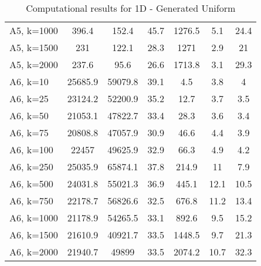 \documentclass{article}
\begin{document}
\begin{center}
\begin{table}[h]
\begin{tabular}{|l||c|c|c|c|c|c|}
    A5, k=1000 & 396.4 & 152.4 & 45.7 & 1276.5 & 5.1 & 24.4\\
    A5, k=1500 & 231 & 122.1 & 28.3 & 1271 & 2.9 & 21\\
A5, k=2000 & 237.6 & 95.6 & 26.6 & 1713.8 & 3.1 & 29.3\\
    \hline
    A6, k=10 & 25685.9 & 59079.8 & 39.1 & 4.5 & 3.8 & 4\\
    A6, k=25 & 23124.2 & 52200.9 & 35.2 & 12.7 & 3.7 & 3.5\\
    A6, k=50 & 21053.1 & 47822.7 & 33.4 & 28.3 & 3.6 & 3.4\\
    A6, k=75 & 20808.8 & 47057.9 & 30.9 & 46.6 & 4.4 & 3.9\\
    A6, k=100 & 22457 & 49625.9 & 32.9 & 66.3 & 4.9 & 4.2\\
    A6, k=250 & 25035.9 & 65874.1 & 37.8 & 214.9 & 11 & 7.9\\
    A6, k=500 & 24031.8 & 55021.3 & 36.9 & 445.1 & 12.1 & 10.5\\
    A6, k=750 & 22178.7 & 56826.6 & 32.5 & 676.8 & 11.2 & 13.4\\
    A6, k=1000 & 21178.9 & 54265.5 & 33.1 & 892.6 & 9.5 & 15.2\\
    A6, k=1500 & 21610.9 & 40921.7 & 33.5 & 1448.5 & 9.7 & 21.3\\
A6, k=2000 & 21940.7 & 49899 & 33.5 & 2074.2 & 10.7 & 32.3\\
    \hline
    \end{tabular}
    \caption{Computational results for 1D - Generated Uniform}
\end{table}
\end{center}
\end{document}
